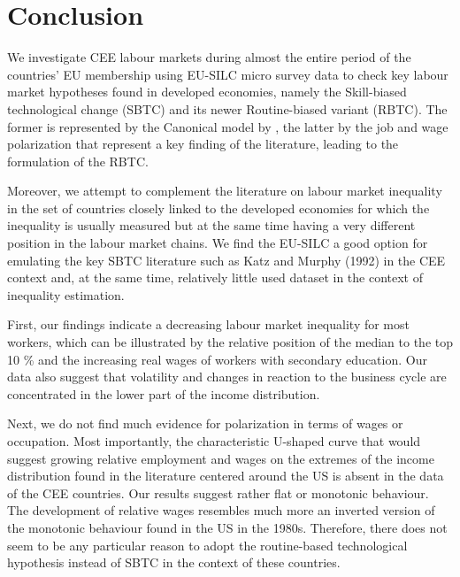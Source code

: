 \documentclass[11pt]{article}
\begin{document}

\section{Conclusion}
We investigate CEE labour markets during almost the entire period of the countries' EU membership using EU-SILC micro survey data to check key labour market hypotheses found in developed economies, namely the Skill-biased technological change (SBTC) and its newer Routine-biased variant (RBTC). The former is represented by the Canonical model by \citet{katz1992changes}, the latter by the job and wage polarization that represent a key finding of the literature, leading to the formulation of the RBTC.

Moreover, we attempt to complement the literature on labour market inequality in the set of countries closely linked to the developed economies for which the inequality is usually measured but at the same time having a very different position in the labour market chains. We find the EU-SILC a good option for emulating the key SBTC literature such as Katz and Murphy (1992) in the CEE context and, at the same time, relatively little used dataset in the context of inequality estimation.

First, our findings indicate a decreasing labour market inequality for most workers, which can be illustrated by the relative position of the median to the top 10 \% and the increasing real wages of workers with secondary education. Our data also suggest that volatility and changes in reaction to the business cycle are concentrated in the lower part of the income distribution.

Next, we do not find much evidence for polarization in terms of wages or occupation. Most importantly, the characteristic U-shaped curve that would suggest growing relative employment and wages on the extremes of the income distribution found in the literature centered around the US is absent in the data of the CEE countries. Our results suggest rather flat or monotonic behaviour. The development of relative wages resembles much more an inverted version of the monotonic behaviour found in the US in the 1980s. Therefore, there does not seem to be any particular reason to adopt the routine-based technological hypothesis instead of SBTC in the context of these countries.
\end{document}
